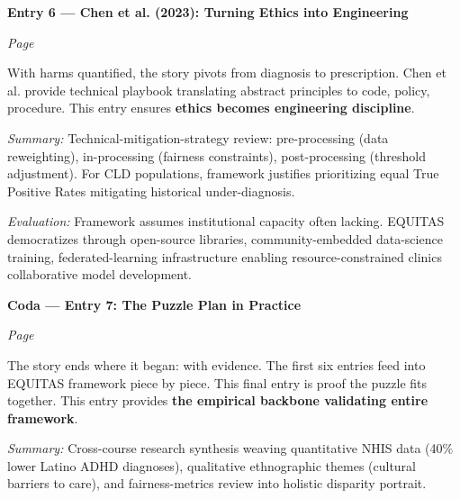 \documentclass[11pt,twoside]{article}
\begin{document}
\noindent\textbf{\large Entry 6 --- Chen et al. (2023): Turning Ethics into Engineering}\hfill

\textit{Page \pageref{entry6}}

\vspace{0.2cm}

\noindent With harms quantified, the story pivots from diagnosis to prescription. Chen et al. provide technical playbook translating abstract principles to code, policy, procedure. This entry ensures \textbf{ethics becomes engineering discipline}.

\vspace{0.3cm}

\noindent \hspace{1cm} \textit{Summary:} Technical-mitigation-strategy review: pre-processing (data reweighting), in-processing (fairness constraints), post-processing (threshold adjustment). For CLD populations, framework justifies prioritizing equal True Positive Rates mitigating historical under-diagnosis.

\vspace{0.1cm}

\noindent \hspace{1cm} \textit{Evaluation:} Framework assumes institutional capacity often lacking. EQUITAS democratizes through open-source libraries, community-embedded data-science training, federated-learning infrastructure enabling resource-constrained clinics collaborative model development.

\vspace{0.5cm}

\noindent\textbf{\large Coda --- Entry 7: The Puzzle Plan in Practice}\hfill

\textit{Page \pageref{coda}}

\vspace{0.2cm}

\noindent The story ends where it began: with evidence. The first six entries feed into EQUITAS framework piece by piece. This final entry is proof the puzzle fits together. This entry provides \textbf{the empirical backbone validating entire framework}.

\vspace{0.3cm}

\noindent \hspace{1cm} \textit{Summary:} Cross-course research synthesis weaving quantitative NHIS data (40\% lower Latino ADHD diagnoses), qualitative ethnographic themes (cultural barriers to care), and fairness-metrics review into holistic disparity portrait.
\end{document}
